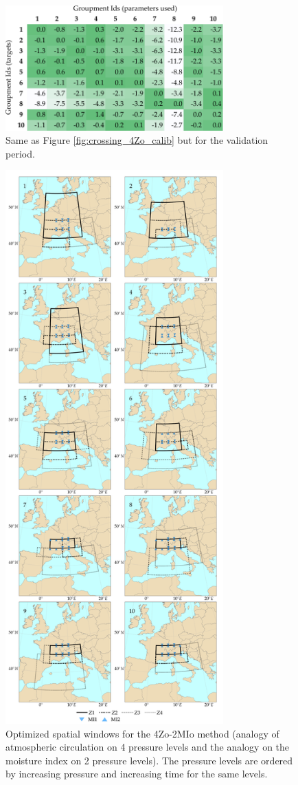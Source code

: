 \documentclass[review]{elsarticle}
\begin{document}
\begin{figure}[t]
	\centerline{\includegraphics[width=8.4cm]{figures/fig06.pdf}}
	\caption{Same as Figure \ref{fig:crossing_4Zo_calib} but for the validation period.}
	\label{fig:crossing_4Zo_valid}
\end{figure}

\begin{figure}[t]
	\centerline{\includegraphics[width=8.4cm]{figures/fig07.pdf}}
	\caption{Optimized spatial windows for the 4Zo-2MIo method (analogy of atmospheric circulation on 4 pressure levels and the analogy on the moisture index on 2 pressure levels). The pressure levels are ordered by increasing pressure and increasing time for the same levels.}
	\label{fig:spatial_windows_4Zo-2MIo}
\end{figure}
\end{document}
